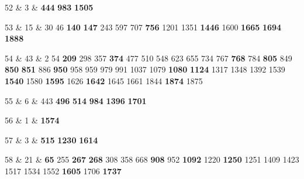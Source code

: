 52 & 3 & \textbf{444} \textbf{983} \textbf{1505} \\  

53 & 15 & 30 46 \textbf{140} \textbf{147} 243 597 707 \textbf{756} 1201 1351 \textbf{1446} 1600 \textbf{1665} \textbf{1694} \textbf{1888} \\  

54 & 43 & 2 54 \textbf{209} 298 357 \textbf{374} 477 510 548 623 655 734 767 \textbf{768} 784 \textbf{805} 849 \textbf{850} \textbf{851} 886 \textbf{950} 958 959 979 991 1037 1079 \textbf{1080} \textbf{1124} 1317 1348 1392 1539 \textbf{1540} 1580 \textbf{1595} 1626 \textbf{1642} 1645 1661 1844 \textbf{1874} 1875 \\  

55 & 6 & 443 \textbf{496} \textbf{514} \textbf{984} \textbf{1396} \textbf{1701} \\  

56 & 1 & \textbf{1574} \\  

57 & 3 & \textbf{515} \textbf{1230} \textbf{1614} \\  

58 & 21 & \textbf{65} 255 \textbf{267} \textbf{268} 308 358 668 \textbf{908} 952 \textbf{1092} 1220 \textbf{1250} 1251 1409 1423 1517 1534 1552 \textbf{1605} 1706 \textbf{1737} \\  